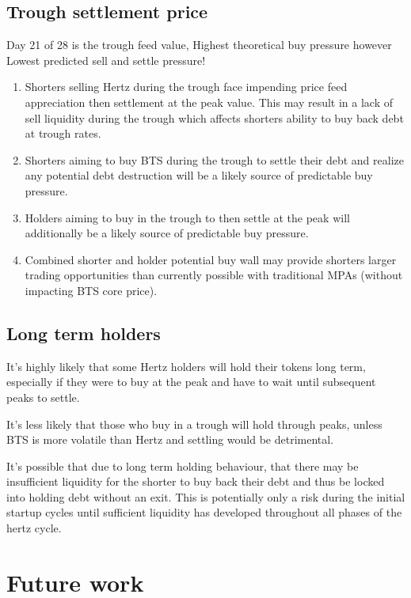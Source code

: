 \documentclass[sigconf]{acmart}
\begin{document}
\subsection{Trough settlement price}

Day 21 of 28 is the trough feed value, Highest theoretical buy pressure however Lowest predicted sell and settle pressure!

\begin{enumerate}[wide, labelwidth=!, labelindent=0pt]
\item Shorters selling Hertz during the trough face impending price feed appreciation then settlement at the peak value. This may result in a lack of sell liquidity during the trough which affects shorters ability to buy back debt at trough rates.
\item Shorters aiming to buy BTS during the trough to settle their debt and realize any potential debt destruction will be a likely source of predictable buy pressure.
\item Holders aiming to buy in the trough to then settle at the peak will additionally be a likely source of predictable buy pressure.
\item Combined shorter and holder potential buy wall may provide shorters larger trading opportunities than currently possible with traditional MPAs (without impacting BTS core price).
\end{enumerate}

\subsection{Long term holders}
It's highly likely that some Hertz holders will hold their tokens long term, especially if they were to buy at the peak and have to wait until subsequent peaks to settle.

It's less likely that those who buy in a trough will hold through peaks, unless BTS is more volatile than Hertz and settling would be detrimental.

It's possible that due to long term holding behaviour, that there may be insufficient liquidity for the shorter to buy back their debt and thus be locked into holding debt without an exit. This is potentially only a risk during the initial startup cycles until sufficient liquidity has developed throughout all phases of the hertz cycle.

\section{Future work}
\end{document}
